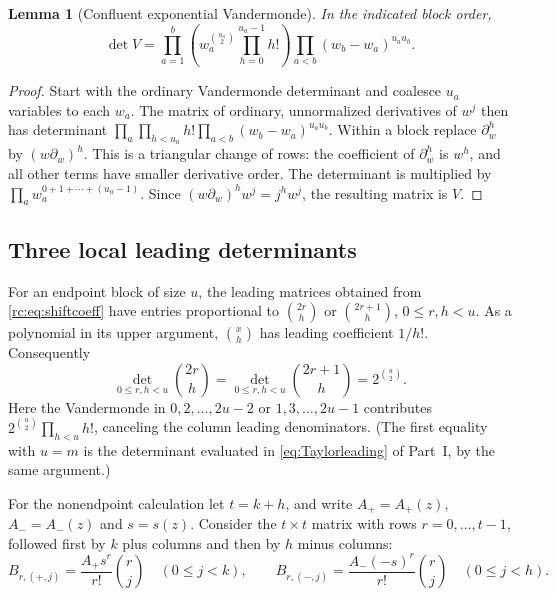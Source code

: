 \documentclass[11pt,a4paper]{article}
\numberwithin{equation}{section}
\newtheorem{lemma}[theorem]{Lemma}
\theoremstyle{definition}
\theoremstyle{remark}
\begin{document}
\begin{lemma}[Confluent exponential Vandermonde]\label{rc:lem:V}
In the indicated block order,
\begin{equation}\label{rc:eq:V}
 \det V=
 \prod_{a=1}^{b}\left(w_a^{\binom{u_a}2}
                         \prod_{h=0}^{u_a-1}h!\right)
 \prod_{a<b}(w_b-w_a)^{u_a u_b}.
\end{equation}
\end{lemma}
\begin{proof}
Start with the ordinary Vandermonde determinant and coalesce $u_a$
variables to each $w_a$.  The matrix of ordinary, unnormalized
derivatives of $w^j$ then has determinant
$\prod_a\prod_{h<u_a}h!\prod_{a<b}(w_b-w_a)^{u_a u_b}$.
Within a block replace $\partial_w^h$ by $(w\partial_w)^h$.
This is a triangular change of rows: the coefficient of
$\partial_w^h$ is $w^h$, and all other terms have smaller derivative
order.  The determinant is multiplied by
$\prod_a w_a^{0+1+\cdots+(u_a-1)}$.  Since
$(w\partial_w)^h w^j=j^h w^j$, the resulting matrix is $V$.
\end{proof}

\subsection{Three local leading determinants}
For an endpoint block of size $u$, the leading matrices obtained from
\eqref{rc:eq:shiftcoeff} have entries proportional to
$\binom{2r}{h}$ or $\binom{2r+1}{h}$, $0\le r,h<u$.
As a polynomial in its upper argument, $\binom{x}{h}$ has leading
coefficient $1/h!$.  Consequently
\begin{equation}\label{rc:eq:binomV}
 \det_{0\le r,h<u}\binom{2r}{h}
 =\det_{0\le r,h<u}\binom{2r+1}{h}
 =2^{\binom u2}.
\end{equation}
Here the Vandermonde in $0,2,\ldots,2u-2$ or $1,3,\ldots,2u-1$
contributes $2^{\binom u2}\prod_{h<u}h!$, canceling the column
leading denominators.  (The first equality with $u=m$ is the
determinant evaluated in \eqref{eq:Taylorleading} of Part~I, by the same
argument.)

For the nonendpoint calculation let $t=k+h$, and write
$A_+=A_+(z)$, $A_-=A_-(z)$ and $s=s(z)$.  Consider the $t\times t$
matrix with rows $r=0,\ldots,t-1$, followed first by $k$ plus columns
and then by $h$ minus columns:
\begin{equation}\label{rc:eq:localmatrix}
 B_{r,(+,j)}=\frac{A_+s^r}{r!}\binom rj\quad(0\le j<k),
 \qquad
 B_{r,(-,j)}=\frac{A_-(-s)^r}{r!}\binom rj\quad(0\le j<h).
\end{equation}
\end{document}
